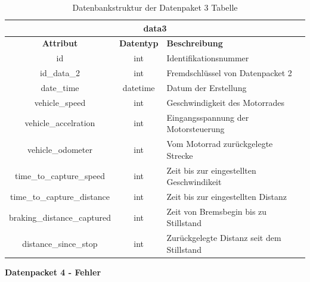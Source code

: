 \begin{table}[H]
	\begin{center}
		\begin{tabular}{|c|c|l|}
			\hline
			\multicolumn{3}{|c|}{\textbf{data3}} \\ \hline
			\textbf{Attribut}           & \textbf{Datentyp} & \textbf{Beschreibung}                     \\ \hline
			id                          & int               & Identifikationsnummer                     \\ \hline
			id\_data\_2                 & int               & Fremdschlüssel von Datenpacket 2          \\ \hline
			date\_time                  & datetime          & Datum der Erstellung                      \\ \hline
			vehicle\_speed              & int               & Geschwindigkeit des Motorrades            \\ \hline
			vehicle\_accelration        & int               & Eingangsspannung der Motorsteuerung       \\ \hline
			vehicle\_odometer           & int               & Vom Motorrad zurückgelegte Strecke        \\ \hline
			time\_to\_capture\_speed    & int               & Zeit bis zur eingestellten Geschwindikeit \\ \hline
			time\_to\_capture\_distance & int               & Zeit bis zur eingestellten Distanz        \\ \hline
			braking\_distance\_captured & int               & Zeit von Bremsbegin bis zu Stillstand     \\ \hline
			distance\_since\_stop       & int               & Zurückgelegte Distanz seit dem Stillstand \\ \hline
		\end{tabular}
		\caption{Datenbankstruktur der Datenpaket 3 Tabelle}
		\label{tab:data3}
	\end{center}
\end{table}

\newpage

\textbf{Datenpacket 4 - Fehler}

